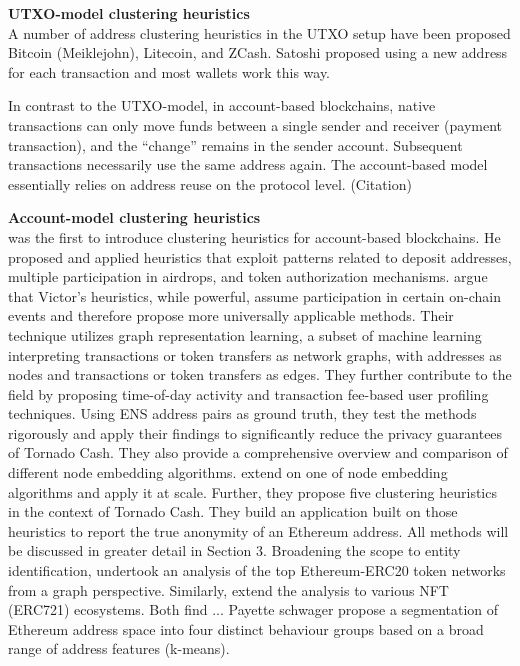 \documentclass[12pt,a4paper,titlepage,oneside,english]{article}
\begin{document}
\textbf{UTXO-model clustering heuristics} \\%
A number of address clustering heuristics in the UTXO setup have been proposed Bitcoin (Meiklejohn), Litecoin, and ZCash. Satoshi proposed using a new address for each transaction and most wallets work this way.

In contrast to the UTXO-model, in account-based blockchains, native transactions can only move funds between a single sender and receiver (payment transaction), and the “change” remains in the sender account. Subsequent transactions necessarily use the same address again. The account-based model essentially relies on address reuse on the protocol level. (Citation)

\textbf{Account-model clustering heuristics}\\
\cite{FV:17} was the first to introduce clustering heuristics for account-based blockchains. He proposed and applied heuristics that exploit patterns related to deposit addresses, multiple participation in airdrops, and token authorization mechanisms. \newline
\cite{Beres2020} argue that Victor’s heuristics, while powerful, assume participation in certain on-chain events and therefore propose more universally applicable methods. Their technique utilizes graph representation learning, a subset of machine learning interpreting transactions or token transfers as network graphs, with addresses as nodes and transactions or token transfers as edges. They further contribute to the field by proposing time-of-day activity and transaction fee-based user profiling techniques. Using ENS address pairs as ground truth, they test the methods rigorously and apply their findings to significantly reduce the privacy guarantees of Tornado Cash. They also provide a comprehensive overview and comparison of different node embedding algorithms. \newline
\cite{wu2022tutela} extend on one of \cite{Beres2020} node embedding algorithms and apply it at scale. Further, they propose five clustering heuristics in the context of Tornado Cash. They build an application built on those heuristics to report the true anonymity of an Ethereum address. All methods will be discussed in greater detail in Section 3.
Broadening the scope to entity identification, \cite{victorlüders2019} undertook an analysis of the top Ethereum-ERC20 token networks from a graph perspective. Similarly, \cite{casalebrunet2021} extend the analysis to various NFT (ERC721) ecosystems. Both find ... Payette schwager propose a segmentation of Ethereum address space into four distinct behaviour groups based on a broad range of address features (k-means). 
\end{document}
